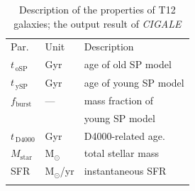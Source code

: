    \begin{table}
\caption[]{Description of the properties of T12 galaxies; the output result of {\em CIGALE}}     
\label{tab: props}
\centering
\begin{tabular}{l l l}
\hline\hline
\noalign{\smallskip}
Par. & Unit & Description\\
\noalign{\smallskip}
\hline
\noalign{\smallskip}
$t_{\,\mathrm{oSP}}$ & Gyr & age of old SP model \\
$t_{\,\mathrm{ySP}}$ & Gyr & age of young SP model \\
$f_\mathrm{burst}$ & --- & mass fraction of \\
& & young SP model \\
\noalign{\smallskip}
$t_{\,\mathrm{D4000}}$ & Gyr & D4000-related age. \\
\noalign{\smallskip}
$M_\mathrm{star}$ & M$_\odot$ & total stellar mass  \\
SFR & M$_\odot$/yr & instantaneous SFR  \\
\noalign{\smallskip}
\hline
\end{tabular}
\end{table}
